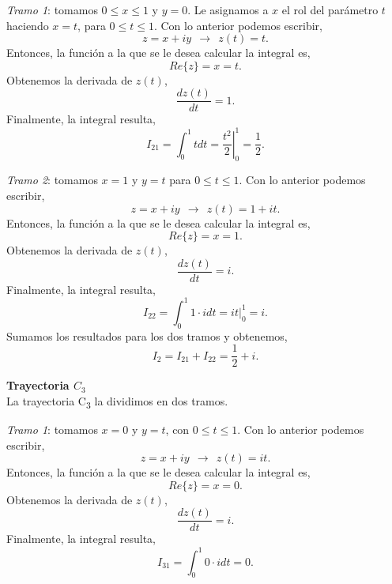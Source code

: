 \documentclass[10pt,a4paper]{article}
\begin{document}
\begin{enumerate}
\begin{enumerate}
	\textit{Tramo 1}: tomamos $0\leq x \leq 1$ y $y=0$.	Le asignamos a $x$ el rol 
	del par\'ametro $t$ haciendo $x=t$, para $0\leq t \leq 1$.	Con lo anterior 
	podemos escribir,
	\begin{equation}
		z = x+iy ~~ \rightarrow ~~ z(t) = t.
		\label{eq:3a_C2T1}
	\end{equation}
	Entonces, la funci\'on a la que se le desea calcular la integral es,
	\begin{equation}
		Re\{z\} = x = t. 
	\end{equation}
	Obtenemos la derivada de $z(t)$,
	\begin{equation}
		\dfrac{dz(t)}{dt} = 1.
	\end{equation}
	Finalmente, la integral resulta,
	\begin{equation}
		I_{21} = \int_0^1 t dt =  \left.\dfrac{t^2}{2}\right|_0^1 = \dfrac{1}{2}.
	\end{equation}
	
	\textit{Tramo 2}: tomamos $x=1$ y $y=t$ para $0\leq t \leq 1$. Con lo 
	anterior podemos escribir,
	\begin{equation}
		z = x+iy ~~ \rightarrow ~~ z(t) = 1+it.
	\end{equation}
	Entonces, la funci\'on a la que se le desea calcular la integral es,
	\begin{equation}
		Re\{z\} = x = 1. 
	\end{equation}
	Obtenemos la derivada de $z(t)$,
	\begin{equation}
		\dfrac{dz(t)}{dt} = i.
	\end{equation}
	Finalmente, la integral resulta,
	\begin{equation}
		I_{22} = \int_0^1 1\cdot i dt = it |_0^1 = i.
	\end{equation}
	Sumamos los resultados para los dos tramos y obtenemos,
	\begin{equation}
		I_2 = I_{21}+I_{22} = \boxed{\dfrac{1}{2} + i}.
	\end{equation}
	
	\textbf{Trayectoria $C_3$} \\
	La trayectoria C\textsubscript3  la dividimos en dos tramos.
	
	\textit{Tramo 1}: tomamos $x = 0$ y $y=t$, con $0\leq t \leq 1$. Con lo 
	anterior podemos escribir,
	\begin{equation}
	z = x+iy ~~ \rightarrow ~~ z(t) = it.
	\label{eq:3a_C3T1}
	\end{equation}
	Entonces, la funci\'on a la que se le desea calcular la integral es,
	\begin{equation}
	Re\{z\} = x = 0. 
	\end{equation}
	Obtenemos la derivada de $z(t)$,
	\begin{equation}
	\dfrac{dz(t)}{dt} = i.
	\end{equation}
	Finalmente, la integral resulta,
	\begin{equation}
	I_{31} = \int_0^1 0 \cdot i dt = 0.
	\end{equation}


\end{enumerate}
\end{enumerate}
\end{document}
